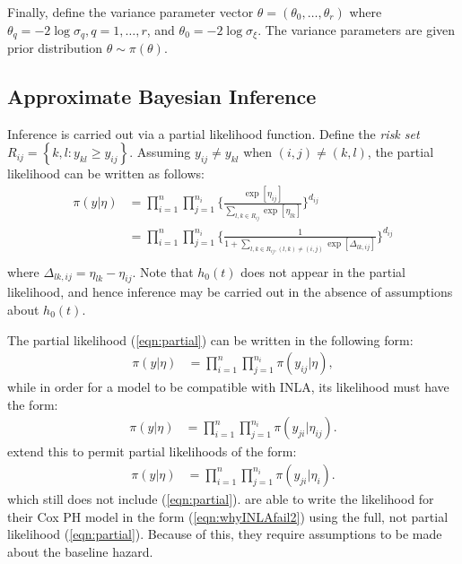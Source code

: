 \documentclass[ba]{imsart}
\begin{document}
Finally, define the variance parameter vector $\theta = (\theta_{0},\ldots,\theta_{r})$ where $\theta_{q} = -2\log\sigma_{q},q = 1,\ldots,r$, and $\theta_{0} = -2\log\sigma_{\xi}$. The variance parameters are given prior distribution $\theta \sim \pi(\theta)$. 

\subsection{Approximate Bayesian Inference}

Inference is carried out via a partial likelihood function. Define the \textit{risk set} $R_{ij} = \left\{k,l : y_{kl} \geq y_{ij}\right\}$. Assuming $y_{ij} \neq y_{kl}$ when $(i,j) \neq (k,l)$, the partial likelihood can be written as follows: 
\begin{equation}\begin{aligned}\label{eqn:partial}
\pi(y|\eta) &= \prod_{i=1}^{n}\prod_{j=1}^{n_{i}} \bigg\{\frac{\exp[\eta_{ij}]}{{\sum_{l,k\in R_{ij}}^{}\exp[\eta_{lk}]}}\bigg \}^{d_{ij}} \\
&= \prod_{i=1}^{n}\prod_{j=1}^{n_{i}} \bigg\{\frac{1}{{1 + \sum_{l,k\in R_{ij} , (l,k) \neq (i,j)}\exp[\Delta_{lk,ij}]}}\bigg \}^{d_{ij}} \\
\end{aligned}\end{equation}
where $\Delta_{lk,ij} = \eta_{lk} - \eta_{ij}$. Note that $h_{0}(t)$ does not appear in the partial likelihood, and hence inference may be carried out in the absence of assumptions about $h_{0}(t)$. 

The partial likelihood (\ref{eqn:partial}) can be written in the following form:
\begin{equation}\begin{aligned}\label{eqn:whyINLAfail1}
\pi(y|\eta) &= \prod_{i=1}^{n}\prod_{j=1}^{n_{i}} \pi(y_{ij}|\eta),
\end{aligned}\end{equation}
while in order for a model to be compatible with INLA, its likelihood must have the form:
\begin{equation}\begin{aligned}\label{eqn:whyINLAfail2}
\pi(y|\eta) &= \prod_{i=1}^{n}\prod_{j=1}^{n_{i}} \pi(y_{ji}|\eta_{ij}).
\end{aligned}\end{equation}
\cite{casecross} extend this to permit partial likelihoods of the form:
\begin{equation}\begin{aligned}\label{eqn:casecrosslik}
\pi(y|\eta) &= \prod_{i=1}^{n}\prod_{j=1}^{n_{i}} \pi(y_{ji}|\eta_{i}).
\end{aligned}\end{equation}
which still does not include (\ref{eqn:partial}). \cite{inlacoxph} are able to write the likelihood for their Cox PH model in the form (\ref{eqn:whyINLAfail2}) using the full, not partial likelihood (\ref{eqn:partial}). Because of this, they require assumptions to be made about the baseline hazard.
\end{document}
